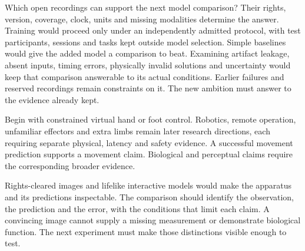 Which open recordings can support the next model comparison? Their rights,
version, coverage, clock, units and missing modalities determine the answer.
Training would proceed only under an independently admitted protocol, with test
participants, sessions and tasks kept outside model selection. Simple baselines
would give the added model a comparison to beat. Examining artifact leakage,
absent inputs, timing errors, physically invalid solutions and uncertainty would
keep that comparison answerable to its actual conditions. Earlier failures and
reserved recordings remain constraints on it. The new ambition must answer to
the evidence already kept.

Begin with constrained virtual hand or foot control. Robotics, remote operation,
unfamiliar effectors and extra limbs remain later research directions, each
requiring separate physical, latency and safety evidence. A successful movement
prediction supports a movement claim. Biological and perceptual claims require
the corresponding broader evidence.

Rights-cleared images and lifelike interactive models would make the apparatus and its predictions inspectable. The comparison should identify the observation, the prediction and the error, with the conditions that limit each claim. A convincing image cannot supply a missing measurement or demonstrate biological function. The next experiment must make those distinctions visible enough to test.